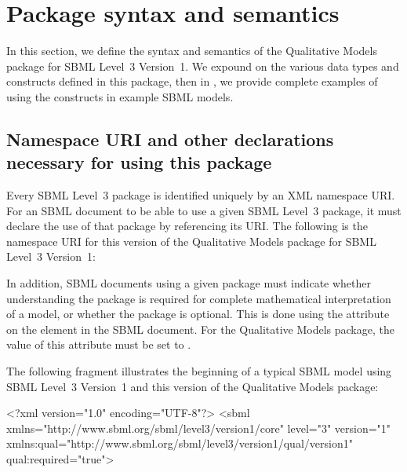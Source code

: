 
\newcommand{\fixttspace}{\hspace*{1pt}}

\section{Package syntax and semantics}

In this section, we define the syntax and semantics of the Qualitative Models package for SBML Level~3 Version~1.  We expound on the
various data types and constructs defined in this package, then in
, we provide complete examples of using the constructs in
example SBML models.

\subsection{Namespace URI and other declarations necessary for using this package}
\label{xml-namespace}

Every SBML Level~3 package is identified uniquely by an XML namespace
URI.  For an SBML document to be able to use a given SBML Level~3
package, it must declare the use of that package by referencing its URI.
The following is the namespace URI for this version of the Qualitative Models package for SBML Level~3 Version~1:
\begin{center}
\end{center}

In addition, SBML documents using a given package must indicate whether
understanding the package is required for complete mathematical
interpretation of a model, or whether the package is optional.  This is
done using the attribute  on the  element
in the SBML document.  For the Qualitative Models package,
the value of this attribute must be set to .

The following fragment illustrates the beginning of a typical SBML model
using SBML Level~3 Version~1 and this version of the Qualitative Models package:

\begin{example}
<?xml version="1.0" encoding="UTF-8"?>
<sbml xmlns="http://www.sbml.org/sbml/level3/version1/core" level="3" version="1"
      xmlns:qual="http://www.sbml.org/sbml/level3/version1/qual/version1" qual:required="true">
\end{example}
    

